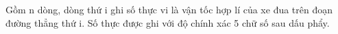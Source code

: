 Gồm n dòng, dòng thứ i ghi số thực vi là vận tốc hợp lí của xe đua trên đoạn đường thẳng thứ i. Số thực được ghi với độ chính xác 5 chữ số sau dấu phẩy.

\